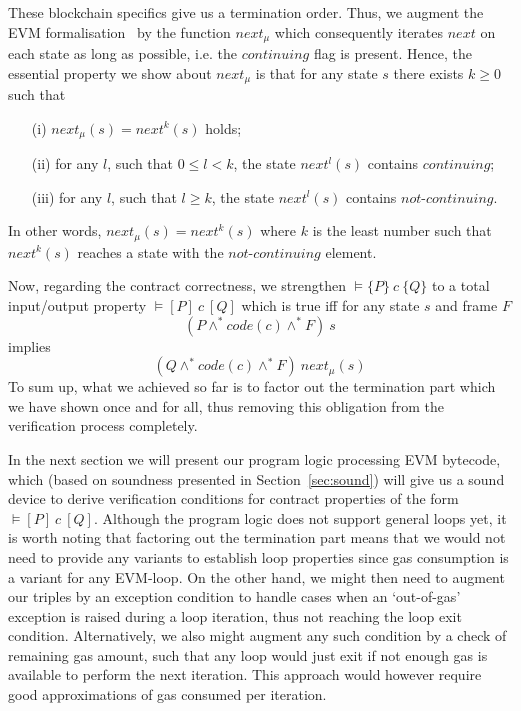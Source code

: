 \documentclass[sigplan,10pt]{acmart}\settopmatter{printfolios=true,printccs=false,printacmref=false}
\newcommand{\sconj}{\wedge^*}
\newcommand{\pvalid}[3]{\models\{#1\}\:#2\:\{#3\}}
\newcommand{\tvalid}[3]{\models[#1]\:#2\:[#3]}
\newcommand{\xnext}{\mathit{next}}
\newcommand{\code}[1]{\mathit{code}(#1)}
\newcommand{\cont}{\mathit{continuing}}
\newcommand{\ncont}{\mathit{not\mbox{-}continuing}}
\begin{document}
These blockchain specifics give us a termination order. Thus, we 
augment the EVM formalisation~\cite{Yoichi} by the function $\xnext_\mu$ which 
consequently iterates $\xnext$ on each state as long as possible, i.e. the $\cont$ flag
is present.
Hence, the essential property we show about $\xnext_\mu$ is that for any state $s$ there exists $k \geq 0$ such that
\begin{itemize}
\item[(i)] $\xnext_\mu(s) = \xnext^k(s)$ holds;
\item[(ii)] for any $l$, such that $0 \le l < k$, the state $\xnext^l(s)$ contains $\cont$;
%
\item[(iii)] for any $l$, such that $l \ge k$, the state $\xnext^l(s)$ contains $\ncont$.
\end{itemize}
In other words, $\xnext_\mu(s) = \xnext^k(s)$ where $k$ is the least number such that
$\xnext^k(s)$ reaches a state with the $\ncont$ element. 

Now, regarding the contract correctness, we strengthen $\pvalid{P}{c}{Q}$ to 
a total input/output property $\tvalid{P}{c}{Q}$ which is true iff
for any state $s$ and frame $F$ 
\[
(P \sconj \code{c} \sconj F)\: s
\] 
implies 
\[
(Q \sconj \code{c} \sconj F)\: \xnext_\mu(s)
\] 
To sum up, what we achieved so far is to factor out the termination part which we have 
shown once and for all, thus removing this obligation from the verification
process completely. 

In the next section we will present our program logic processing EVM bytecode, 
which (based on soundness presented in Section~\ref{sec:sound}) will give us 
a sound device to derive verification conditions for contract properties of the form $\tvalid{P}{c}{Q}$.   
%
Although the program logic does not support general loops yet, it is worth noting that factoring out the termination part
means that we would not need to provide any variants to establish loop properties since
gas consumption is a variant for any EVM-loop. On the other hand, we might then need to augment our triples
by an exception condition to handle cases when an `out-of-gas' exception is raised during
a loop iteration, thus not reaching the loop exit condition. Alternatively, we also might augment
any such condition by a check of remaining gas amount, such that any loop would just exit if not enough gas
is available to perform the next iteration. This approach would however require good approximations
of gas consumed per iteration.   
%
%       
\end{document}
